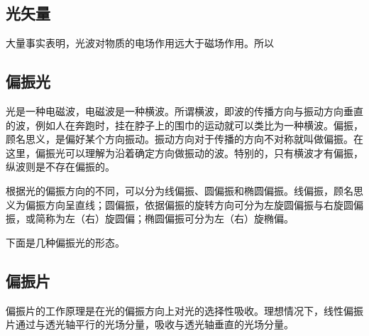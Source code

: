
\begin{issues}
\issueDraft
\end{issues}


\subsection{光矢量}
大量事实表明，光波对物质的电场作用远大于磁场作用。所以

\subsection{偏振光}

光是一种电磁波，电磁波是一种横波。所谓横波，即波的传播方向与振动方向垂直的波，例如人在奔跑时，挂在脖子上的围巾的运动就可以类比为一种横波。偏振，顾名思义，是偏好某个方向振动。振动方向对于传播的方向不对称就叫做偏振。在这里，偏振光可以理解为沿着确定方向做振动的波。特别的，只有横波才有偏振，纵波则是不存在偏振的。

根据光的偏振方向的不同，可以分为线偏振、圆偏振和椭圆偏振。线偏振，顾名思义为偏振方向呈直线；圆偏振，依据偏振的旋转方向可分为左旋圆偏振与右旋圆偏振，或简称为左（右）旋圆偏；椭圆偏振可分为左（右）旋椭偏。

下面是几种偏振光的形态。


\subsection{偏振片}
偏振片的工作原理是在光的偏振方向上对光的选择性吸收。理想情况下，线性偏振片通过与透光轴平行的光场分量，吸收与透光轴垂直的光场分量。

